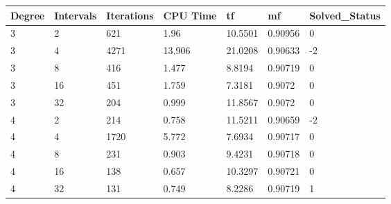 \begin{tabular}{lllllll}
Degree & Intervals & Iterations & CPU Time & tf & mf & Solved_Status \\ 
\hline 
3 & 2 & 621 & 1.96 & 10.5501 & 0.90956 & 0 \\ 
3 & 4 & 4271 & 13.906 & 21.0208 & 0.90633 & -2 \\ 
3 & 8 & 416 & 1.477 & 8.8194 & 0.90719 & 0 \\ 
3 & 16 & 451 & 1.759 & 7.3181 & 0.9072 & 0 \\ 
3 & 32 & 204 & 0.999 & 11.8567 & 0.9072 & 0 \\ 
4 & 2 & 214 & 0.758 & 11.5211 & 0.90659 & -2 \\ 
4 & 4 & 1720 & 5.772 & 7.6934 & 0.90717 & 0 \\ 
4 & 8 & 231 & 0.903 & 9.4231 & 0.90718 & 0 \\ 
4 & 16 & 138 & 0.657 & 10.3297 & 0.90721 & 0 \\ 
4 & 32 & 131 & 0.749 & 8.2286 & 0.90719 & 1 \\ 
\hline 
\end{tabular}